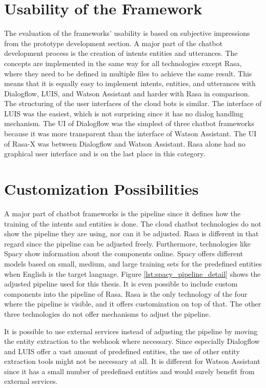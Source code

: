 \section*{Usability of the Framework}
The evaluation of the frameworks' usability is based on subjective impressions from the prototype development section.
A major part of the chatbot development process is the creation of intents entities and utterances.
The concepts are implemented in the same way for all technologies except Rasa, where they need to be defined in multiple files to achieve the same result.
This means that it is equally easy to implement intents, entities, and utterances with Dialogflow, LUIS, and Watson Assistant and harder with Rasa in comparison.
The structuring of the user interfaces of the cloud bots is similar.
The interface of LUIS was the easiest, which is not surprising since it has no dialog handling mechanism.
The UI of Dialogflow was the simplest of three chatbot frameworks because it was more transparent than the interface of Watson Assistant.
The UI of Rasa-X was between Dialogflow and Watson Assistant.
Rasa alone had no graphical user interface and is on the last place in this 
category. 

\section*{Customization Possibilities}
A major part of chatbot frameworks is the pipeline since it defines how the training of the intents and entities is done.
The cloud chatbot technologies do not show the pipeline they are using, nor can it be adjusted.
Rasa is different in that regard since the pipeline can be adjusted freely.
Furthermore, technologies like Spacy show information about the components online.
Spacy offers different models based on small, medium, and large training sets for the predefined entities when English is the target language.
Figure \ref{lst:spacy_pipeline_detail} shows the adjusted pipeline used for this thesis.
It is even possible to include custom components into the pipeline of Rasa.
Rasa is the only technology of the four where the pipeline is visible, and it offers customization on top of that.
The other three technologies do not offer mechanisms to adjust the pipeline.

It is possible to use external services instead of adjusting the pipeline by 
moving the entity extraction to the webhook where necessary.
Since especially Dialogflow and LUIS offer a vast amount of predefined entities, the use of other entity extraction tools might not be necessary at all.
It is different for Watson Assistant since it has a small number of predefined entities and would surely benefit from external services.

